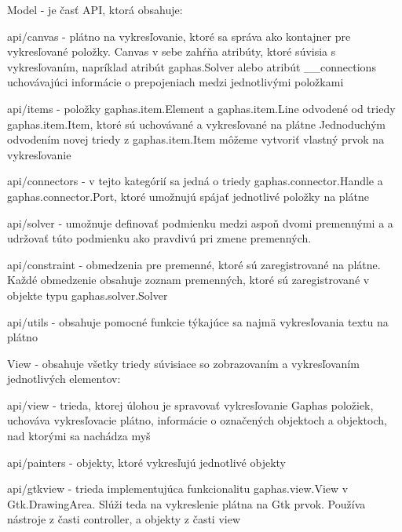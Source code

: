 \documentclass[11pt,oneside,final]{fithesis2}
\begin{document}
\begin{list}{•}{}

\item Model - je časť API, ktorá obsahuje:

    \begin{list}{•}{}
    	\item api/canvas - plátno na vykresľovanie, ktoré sa správa ako kontajner pre vykresľované položky. Canvas v sebe zahŕňa atribúty, ktoré súvisia s vykresľovaním, napríklad atribút gaphas.Solver alebo atribút \_\_connections uchovávajúci informácie o prepojeniach medzi jednotlivými položkami
    	\item api/items - položky gaphas.item.Element a gaphas.item.Line odvodené od triedy gaphas.item.Item, ktoré sú uchovávané a vykresľované na plátne
    	Jednoduchým odvodením novej triedy z gaphas.item.Item môžeme vytvoriť vlastný prvok na vykresľovanie
    	\item api/connectors - v tejto kategórií sa jedná o triedy gaphas.connector.Handle a gaphas.connector.Port, ktoré umožnujú spájať jednotlivé položky na plátne
    	\item api/solver - umožnuje definovať podmienku medzi aspoň dvomi premennými a a udržovať túto podmienku ako pravdivú pri zmene premenných.
 		\item api/constraint - obmedzenia pre premenné, ktoré sú zaregistrované na plátne. Každé obmedzenie obsahuje zoznam premenných, ktoré sú zaregistrované v objekte typu gaphas.solver.Solver 
 		\item api/utils - obsahuje pomocné funkcie týkajúce sa najmä vykresľovania textu na plátno
    \end{list}


\item View - obsahuje všetky triedy súvisiace so zobrazovaním a vykresľovaním jednotlivých elementov:
    \begin{list}{•}{}
    \item api/view - trieda, ktorej úlohou je spravovať vykresľovanie Gaphas položiek, uchováva vykresľovacie plátno, informácie o označených objektoch a objektoch, nad ktorými sa nachádza myš
    \item api/painters - objekty, ktoré vykresľujú jednotlivé objekty
    \item api/gtkview - trieda implementujúca funkcionalitu gaphas.view.View v Gtk.DrawingArea. Slúži teda na vykreslenie plátna na Gtk prvok. Používa nástroje z časti controller, a objekty z časti view
    \end{list}



\end{list}
\end{document}
